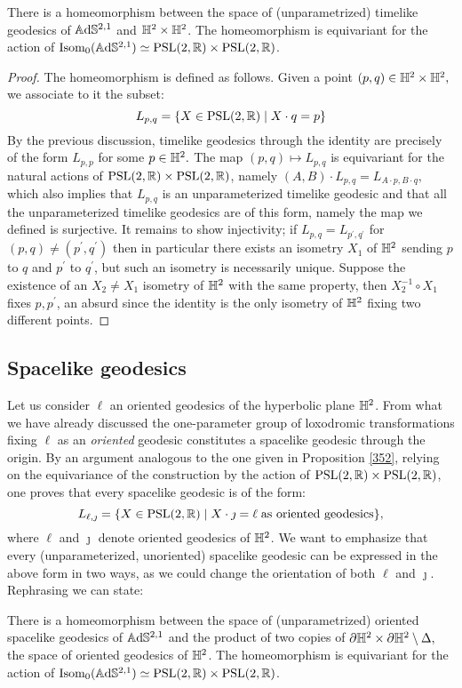 \begin{proposition}\label{352}
    There is a homeomorphism between the space of (unparametrized) timelike geodesics of $\mathbb{A}\mathrm{d}\mathbb{S}^{2,1}$ and $\mathbb{H}^2\times\mathbb{H}^2$. The homeomorphism is equivariant for the action of $\text{Isom}_{0} (\mathbb{A}\mathrm{d}\mathbb{S}^{2,1})\simeq \text{PSL}(2,\mathbb{R})\times\text{PSL}(2,\mathbb{R})$.
\end{proposition}
\begin{proof}
    The homeomorphism is defined as follows. Given a point $(p,q)\in \mathbb{H}^2\times\mathbb{H}^2,$ we associate to it the subset: 
    \[
        L_{p,q}=\{X\in\text{PSL}(2,\mathbb{R})\;|\;X\cdot q=p\}
    \]
    By the previous discussion, timelike geodesics through the identity are precisely of the form $L_{p,p}$ for some $p\in\mathbb{H}^2.$ The map $(p,q)\mapsto L_{p,q}$ is equivariant for the natural actions of $\text{PSL}(2,\mathbb{R})\times \text{PSL}(2,\mathbb{R})$, namely $(A,B)\cdot L_{p,q}=L_{A\cdot p,B\cdot q},$ which also implies that $L_{p,q}$ is an unparameterized timelike geodesic and that all the unparameterized timelike geodesics are of this form, namely the map we defined is surjective. It remains to show injectivity; if $L_{p,q}=L_{p^{\prime} ,q^{\prime} }$ for $(p,q)\neq(p^{\prime},q^{\prime} )$ then in particular there exists an isometry $X_1$ of $\mathbb{H}^2$ sending $p$ to $q$ and $p^{\prime} $ to $q^{\prime}$, but such an isometry is necessarily unique. Suppose the existence of an $X_2\neq X_1$ isometry of $\mathbb{H}^2$ with the same property, then $X_2^{-1}\circ X_1$ fixes $p,p^{\prime}$, an absurd since the identity is the only isometry of $\mathbb{H}^2$ fixing two different points.
\end{proof}

\subsection{Spacelike geodesics}
Let us consider $\ell$ an oriented geodesics of the hyperbolic plane $\mathbb{H}^2$. From what we have already discussed the one-parameter group of loxodromic transformations fixing $\ell$ as an \textit{oriented} geodesic constitutes a spacelike geodesic through the origin. By an argument analogous to the one given in Proposition \ref{352}, relying on the equivariance of the construction by the action of $\text{PSL}(2,\mathbb{R})\times\text{PSL}(2,\mathbb{R})$, one proves that every spacelike geodesic is of the form: 
\[
    L_{\ell,\jmath}=\{X\in\text{PSL}(2,\mathbb{R})\;|\;X\cdot\jmath=\ell\;\text{as oriented geodesics}\},
\]
where $\ell$ and $\jmath$ denote oriented geodesics of $\mathbb{H}^2$. We want to emphasize that every (unparameterized, unoriented) spacelike geodesic can be expressed in the above form in two ways, as we could change the orientation of both $\ell$ and $\jmath$. Rephrasing we can state: 
\begin{proposition}\label{353}
    There is a homeomorphism between the space of (unparametrized) oriented spacelike geodesics of $\mathbb{A}\mathrm{d}\mathbb{S}^{2,1}$ and the product of two copies of $\partial\mathbb{H}^2\times\partial\mathbb{H}^2\setminus\Delta,$ the space of oriented geodesics of $\mathbb{H}^2$. The homeomorphism is equivariant for the action of $\text{Isom}_0(\mathbb{A}\mathrm{d}\mathbb{S}^{2,1})\simeq\text{PSL}(2,\mathbb{R})\times\text{PSL}(2,\mathbb{R})$.
\end{proposition}

